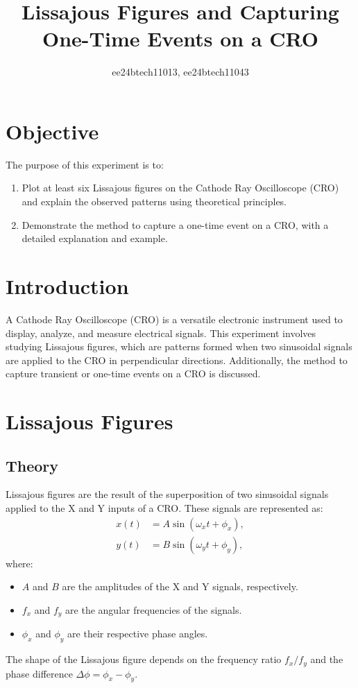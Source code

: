 \documentclass[a4paper,12pt]{article}
\title{Lissajous Figures and Capturing One-Time Events on a CRO}
\author{ee24btech11013, ee24btech11043}
\begin{document}
\maketitle

\section*{Objective}
The purpose of this experiment is to:
\begin{enumerate}
    \item Plot at least six Lissajous figures on the Cathode Ray Oscilloscope (CRO) and explain the observed patterns using theoretical principles.
    \item Demonstrate the method to capture a one-time event on a CRO, with a detailed explanation and example.
\end{enumerate}

\section*{Introduction}
A Cathode Ray Oscilloscope (CRO) is a versatile electronic instrument used to display, analyze, and measure electrical signals. This experiment involves studying Lissajous figures, which are patterns formed when two sinusoidal signals are applied to the CRO in perpendicular directions. Additionally, the method to capture transient or one-time events on a CRO is discussed.

\section*{Lissajous Figures}

\subsection*{Theory}
Lissajous figures are the result of the superposition of two sinusoidal signals applied to the X and Y inputs of a CRO. These signals are represented as:
\begin{align*}
    x(t) &= A \sin(\omega_x t + \phi_x), \\
    y(t) &= B \sin(\omega_y t + \phi_y),
\end{align*}
where:
\begin{itemize}
    \item $A$ and $B$ are the amplitudes of the X and Y signals, respectively.
    \item $f_x$ and $f_y$ are the angular frequencies of the signals.
    \item $\phi_x$ and $\phi_y$ are their respective phase angles.
\end{itemize}
The shape of the Lissajous figure depends on the frequency ratio $f_x/f_y$ and the phase difference $\Delta \phi = \phi_x - \phi_y$. 
\end{document}
